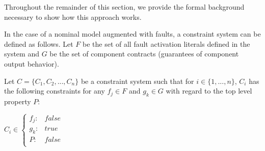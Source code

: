 Throughout the remainder of this section, we provide the formal background necessary to show how this approach works.

In the case of a nominal model augmented with faults, a constraint system can be defined as follows. Let $F$ be the set of all fault activation literals defined in the system and $G$ be the set of component contracts (guarantees of component output behavior). 

\begin{definition}Let $C = \{C_1,C_2,...,C_n\}$ be a constraint system such that for $i \in \{1,...,n\}$, $C_i$ has the following constraints for any $f_j \in F$ and $g_k \in G$ with regard to the top level property $P$: 
\begin{center}
$C_i \in \left\{ \begin{array}{ll}
	f_j :&  false\\
	g_k :& true\\
	P :& false\\
\end{array}\right.$	
\end{center}
\label{def:constraintsystem}
\end{definition}

